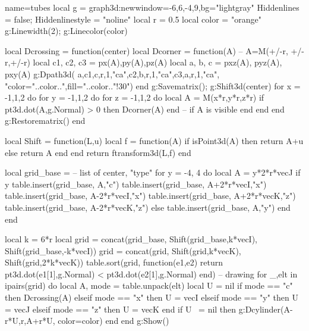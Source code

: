 \documentclass[boder=5pt]{standalone}
\begin{document}
\begin{luadraw}{name=tubes}
local g = graph3d:new{window={-6,6,-4,9},bg="lightgray" }
Hiddenlines = false; Hiddenlinestyle = "noline"
local r = 0.5
local color = "orange"
g:Linewidth(2); g:Linecolor(color)

local Dcrossing = function(center)
    local Dcorner = function(A) -- A=M(+/-r, +/-r,+/-r)
        local c1, c2, c3 = px(A),py(A),pz(A)
        local a, b, c = pxz(A), pyz(A), pxy(A)
        g:Dpath3d( {a,c1,c,r,1,"ca",c2,b,r,1,"ca",c3,a,r,1,"ca"}, "color="..color..",fill="..color.."!30")
    end
    g:Savematrix(); g:Shift3d(center)
    for x = -1,1,2 do
        for y = -1,1,2 do
            for z = -1,1,2 do
                local A = M(x*r,y*r,z*r)
                if pt3d.dot(A,g.Normal) > 0 then Dcorner(A) end -- if A is visible
            end
        end
    end
    g:Restorematrix()
end

local Shift = function(L,u)
    local f = function(A)
        if isPoint3d(A) then return A+u else return A end
    end
    return ftransform3d(L,f)
end

local grid_base = {} -- list of {center, "type"}
for y = -4, 4  do
    local A = y*2*r*vecJ
    if y%
        table.insert(grid_base, {A,"c"})
        table.insert(grid_base, {A+2*r*vecI,"x"})
        table.insert(grid_base, {A-2*r*vecI,"x"})
        table.insert(grid_base, {A+2*r*vecK,"z"})
        table.insert(grid_base, {A-2*r*vecK,"z"})
    else
        table.insert(grid_base, {A,"y"})
    end
end

local k = 6*r
local grid = concat(grid_base, Shift(grid_base,k*vecI), Shift(grid_base,-k*vecI))
grid = concat(grid, Shift(grid,k*vecK), Shift(grid,2*k*vecK))
table.sort(grid, function(e1,e2) return pt3d.dot(e1[1],g.Normal) < pt3d.dot(e2[1],g.Normal) end)
-- drawing
for _,elt in ipairs(grid) do
    local A, mode = table.unpack(elt)
    local U = nil
    if mode == "c" then Dcrossing(A)
    elseif mode == "x" then U = vecI
    elseif mode == "y" then U = vecJ
    elseif mode == "z" then U = vecK
    end
    if U ~= nil then g:Dcylinder(A-r*U,r,A+r*U, {color=color}) end
end 
g:Show()
\end{luadraw}
\end{document}
